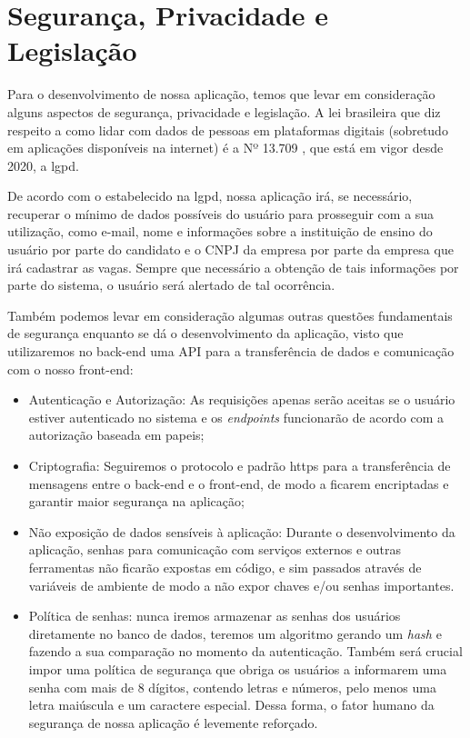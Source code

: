 \section{Segurança, Privacidade e Legislação}
Para o desenvolvimento de nossa aplicação, temos que levar em consideração  alguns aspectos de segurança, privacidade e legislação.
A lei brasileira que diz respeito a como lidar com dados de pessoas em plataformas digitais (sobretudo em aplicações disponíveis na internet) é a Nº 13.709 \cite{lgpd},
que está em vigor desde 2020, a \gls{lgpd}.

De acordo com o estabelecido na \gls{lgpd}, nossa aplicação irá, se necessário, recuperar o mínimo de dados possíveis do usuário para prosseguir com a sua utilização, como e-mail, nome
e informações sobre a instituição de ensino do usuário por parte do candidato e o CNPJ da empresa por parte da empresa que irá cadastrar as vagas. Sempre que necessário a obtenção de tais informações
por parte do sistema, o usuário será alertado de tal ocorrência.

Também podemos levar em consideração algumas outras questões fundamentais de segurança enquanto se dá o desenvolvimento da aplicação, visto que utilizaremos no back-end uma API para a transferência de 
dados e comunicação com o nosso front-end:
\begin{itemize}
	\item Autenticação e Autorização: As requisições apenas serão aceitas se o usuário estiver autenticado no sistema e os \textit{endpoints} funcionarão de acordo com a autorização baseada em papeis;
	\item Criptografia: Seguiremos o protocolo e padrão \gls{https} para a transferência de mensagens entre o back-end e o front-end, de modo a ficarem encriptadas e garantir maior segurança na aplicação;
	\item Não exposição de dados sensíveis à aplicação: Durante o desenvolvimento da aplicação, senhas para comunicação com serviços externos e outras ferramentas não ficarão expostas em código, e sim passados
	através de variáveis de ambiente de modo a não expor chaves e/ou senhas importantes.
	\item Política de senhas: nunca iremos armazenar as senhas dos usuários diretamente no banco de dados, teremos um algoritmo gerando um \textit{hash} e fazendo a sua comparação no momento da autenticação.
	Também será crucial impor uma política de segurança que obriga os usuários a informarem uma senha com mais de 8 dígitos, contendo letras e números, pelo menos uma letra maiúscula e um caractere especial.
	Dessa forma, o fator humano da segurança de nossa aplicação é levemente reforçado.
\end{itemize}